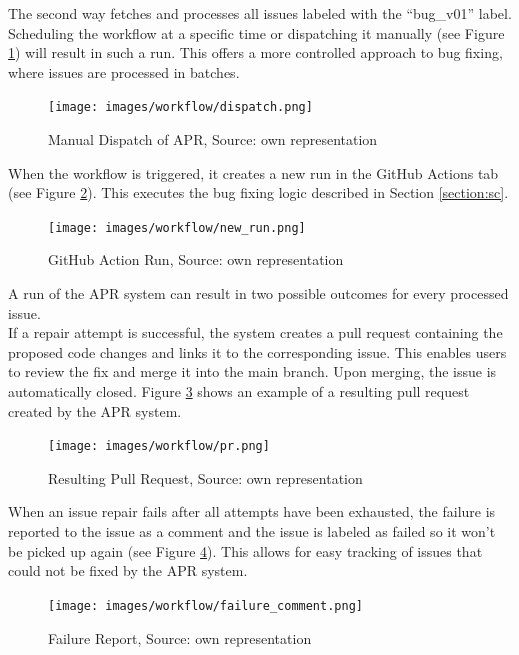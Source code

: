 The second way fetches and processes all issues labeled with the ``bug\_v01'' label. Scheduling the workflow at a specific time or dispatching it manually (see Figure \ref{fig:dispatch}) will result in such a run. This offers a more controlled approach to bug fixing, where issues are processed in batches.

\begin{figure}[H]
    \centering
    \texttt{[image: images/workflow/dispatch.png]}
    \caption{Manual Dispatch of APR, Source: own representation}
    \label{fig:dispatch}
\end{figure}

When the workflow is triggered, it creates a new run in the GitHub Actions tab (see Figure \ref{fig:apr-action}). This executes the bug fixing logic described in Section \ref{section:sc}.


\begin{figure}[H]
    \centering
    \texttt{[image: images/workflow/new\_run.png]}
    \caption{GitHub Action Run, Source: own representation}
    \label{fig:apr-action}
\end{figure}

A run of the APR system can result in two possible outcomes for every processed issue. \\
If a repair attempt is successful, the system creates a pull request containing the proposed code changes and links it to the corresponding issue. This enables users to review the fix and merge it into the main branch. Upon merging, the issue is automatically closed.
Figure \ref{fig:pr} shows an example of a resulting pull request created by the APR system.

\begin{figure}[H]
    \centering
    \texttt{[image: images/workflow/pr.png]}
    \caption{Resulting Pull Request, Source: own representation}
    \label{fig:pr}
\end{figure}

When an issue repair fails after all attempts have been exhausted, the failure is reported to the issue as a comment and the issue is labeled as failed so it won't be picked up again (see Figure \ref{fig:failure-report}). This allows for easy tracking of issues that could not be fixed by the APR system.

\begin{figure}[H]
    \centering
    \texttt{[image: images/workflow/failure\_comment.png]}
    \caption{Failure Report, Source: own representation}
    \label{fig:failure-report}
\end{figure}

